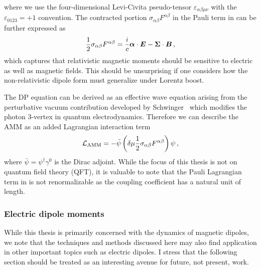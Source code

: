 where we use the four-dimensional Levi-Civita pseudo-tensor $\varepsilon_{\alpha\beta\mu\nu}$ with the $\varepsilon_{0123}=+1$ convention. The contracted portion $\sigma_{\alpha\beta}F^{\alpha\beta}$ in the Pauli term in  can be further expressed as
\begin{alignat}{1}
	\label{dp:2} \frac{1}{2}\sigma_{\alpha\beta}F^{\alpha\beta}=\frac{i}{c}\boldsymbol{\alpha}\cdot\boldsymbol{E}-\boldsymbol{\Sigma}\cdot\boldsymbol{B}\,,
\end{alignat}
which captures that relativistic magnetic moments should be sensitive to electric as well as magnetic fields. This should be unsurprising if one considers how the non-relativistic dipole form must generalize under Lorentz boost.

The DP equation can be derived as an effective wave equation arising from the perturbative vacuum contribution developed by Schwinger~\citep{Itzykson:1980rh,Schwartz:2014sze} which modifies the photon 3-vertex in quantum electrodynamics. Therefore we can describe the AMM as an added Lagrangian interaction term
\begin{align}
    \label{lamm:1}
    {\cal L}_{\rm AMM} = -{\bar\psi}\left(\delta\mu\frac{1}{2}\sigma_{\alpha\beta}F^{\alpha\beta}\right)\psi\,,
\end{align}
where ${\bar\psi}=\psi^{\dagger}\gamma^{0}$ is the Dirac adjoint. While the focus of this thesis is not on quantum field theory (QFT), it is valuable to note that the Pauli Lagrangian term in  is not renormalizable as the coupling coefficient has a natural unit of length.

\subsubsection{Electric dipole moments}
\label{sec:edm}
\noindent While this thesis is primarily concerned with the dynamics of magnetic dipoles, we note that the techniques and methods discussed here may also find application in other important topics such as electric dipoles. I stress that the following section should be treated as an interesting avenue for future, not present, work.

